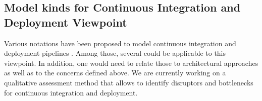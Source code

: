 %
%
%
%
%
%
%
%
%
%

%
%



\subsection{Model kinds for Continuous Integration and Deployment Viewpoint}\label{mk:list}

Various notations have been proposed to model continuous integration and deployment pipelines \cite{SB2014}.
Among those, several could be applicable to this viewpoint.
In addition, one would need to relate those to architectural approaches as well as to the concerns defined above. 
We are currently working on a qualitative assessment method that allows to identify disruptors and bottlenecks for continuous integration and deployment.

